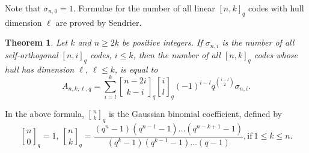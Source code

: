 \documentclass[a4paper,11pt]{article}
\newtheorem{theorem}{Theorem}
\newtheorem{corollary}[theorem]{Corollary}
\begin{document}
Note that $\sigma_{n,0}=1$. %
%
%
Formulae for the number of all linear $[n,k]_q$ codes with hull dimension $\ell$ are proved by Sendrier.

\begin{theorem}\cite{Sendrier_hull} \label{theorem.Sendrier}
Let $k$ and $n\ge 2k$ be positive integers. If $\sigma_{n,i}$ is the number of all self-orthogonal $[n,i]_q$ codes, $i\le k$, then the number of all $[n,k]_q$ codes whose hull has dimension $\ell$, $\ell\le k$, is equal to
\begin{equation}
A_{n,k,\ell,q}=\sum_{i=l}^k {n-2i\brack k-i}_q{i\brack l}_q(-1)^{i-l}q^{i-l\choose 2}\sigma_{n,i}.
\end{equation}
\end{theorem}

In the above formula, ${n\brack k}_q$ is the Gaussian binomial coefficient, defined by
\begin{equation}
{n\brack 0}_q=1, \ {n\brack k}_q=\frac{(q^n-1)(q^{n-1}-1)\ldots(q^{n-k+1}-1)}{(q^k-1)(q^{k-1}-1)\ldots(q-1)}, \mbox{if} \ 1\le k\le n.
\end{equation}
\end{document}
